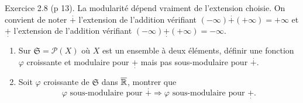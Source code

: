   \noindent Exercice 2.8 (p 13). La modularité dépend vraiment de l'extension choisie.\newline
  On convient de noter $\overset{.}{+}$ l'extension de l'addition vérifiant $(-\infty) \overset{.}{+} (+\infty) = +\infty$ et $\underset{.}{+}$ l'extension de l'addition vérifiant $(-\infty) \underset{.}{+} (+\infty) = -\infty$.
  \begin{enumerate}
    \item Sur $\mathfrak{S} = \mathcal{P}(X)$ où $X$ est un ensemble à deux éléments, définir une fonction $\varphi$ croissante et modulaire pour $\underset{.}{+}$ mais pas sous-modulaire pour $\overset{.}{+}$. 
    \item Soit $\varphi$ croissante de $\mathfrak{S}$ dans $\overline{\mathbb{R}}$, montrer que 
\begin{displaymath}
  \varphi \text{ sous-modulaire pour } \overset{.}{+} \Rightarrow \varphi \text{ sous-modulaire pour } \underset{.}{+}.
\end{displaymath}
  \end{enumerate}
